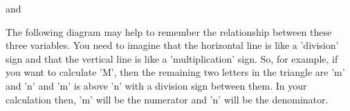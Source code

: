       
      \label{m38717*id277579}and\par 
      \label{m38717*id277584}\nopagebreak\noindent{}
    
      
      \label{m38717*id277605}The following diagram may help to remember the relationship between these three variables. You need to imagine that the horizontal line is like a 'division' sign and that the vertical line is like a 'multiplication' sign. So, for example, if you want to calculate 'M', then the remaining two letters in the triangle are 'm' and 'n' and 'm' is above 'n' with a division sign between them. In your calculation then, 'm' will be the numerator and 'n' will be the denominator.\par 
      \label{m38717*id277613}
        
    \setcounter{subfigure}{0}


